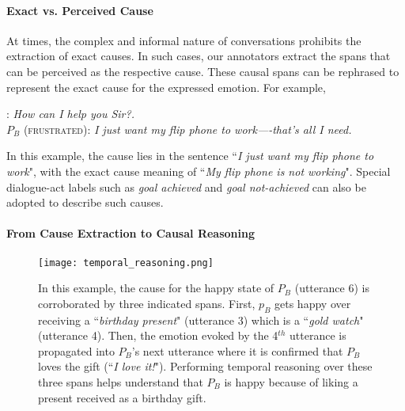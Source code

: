 \documentclass[smallextended]{svjour3}
\newcommand\emo[1]{\textsc{#1}}
\newcommand\0{\hphantom{0}}
\begin{document}
\paragraph{Exact vs. Perceived Cause} At times, the complex and informal nature of conversations prohibits the extraction of exact causes. In such cases, our annotators extract the spans that can be perceived as the respective cause. These causal spans can be rephrased to represent the exact cause for the expressed emotion. For example,

\begin{exe}
\ex {$P_A$ (\emo{neutral})}: \textit{How can I help you Sir?.}\\
{$P_B$ (\emo{frustrated})}: \textit{I just want my flip phone to work----that's all I need.}
\label{ex:exact1}
\end{exe}
In this example, the cause lies in the sentence ``\textit{I just want my flip phone to work}", with the exact cause meaning of ``\textit{My flip phone is not working}". Special dialogue-act labels such as \emph{goal achieved} and \emph{goal not-achieved} can also be adopted to describe such causes.

\paragraph{From Cause Extraction to Causal Reasoning}

\begin{figure}[t!]
    \centering
    \texttt{[image: temporal\_reasoning.png]}
    \caption{{In this example, the cause for the happy state of $P_B$ (utterance 6) is corroborated by three indicated spans. First, $p_B$ gets happy over receiving a ``\textit{birthday present}" (utterance 3) which is a ``\textit{gold watch}" (utterance 4). Then, the emotion evoked by the 4$^{th}$ utterance is propagated into $P_B$'s next utterance where it is confirmed that $P_B$ loves the gift (``\textit{I love it!}"). Performing temporal reasoning over these three spans helps understand that $P_B$ is happy because of liking a present received as a birthday gift.}}
    \label{fig:temporal_reasoning}
\end{figure}
\end{document}
